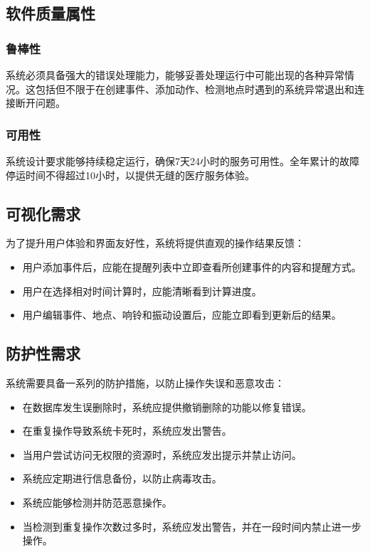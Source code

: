 \subsection{软件质量属性}
\subsubsection{鲁棒性}
系统必须具备强大的错误处理能力，能够妥善处理运行中可能出现的各种异常情况。这包括但不限于在创建事件、添加动作、检测地点时遇到的系统异常退出和连接断开问题。

\subsubsection{可用性}
系统设计要求能够持续稳定运行，确保7天24小时的服务可用性。全年累计的故障停运时间不得超过10小时，以提供无缝的医疗服务体验。

\subsection{可视化需求}
为了提升用户体验和界面友好性，系统将提供直观的操作结果反馈：
\begin{itemize}
	\item 用户添加事件后，应能在提醒列表中立即查看所创建事件的内容和提醒方式。
	\item 用户在选择相对时间计算时，应能清晰看到计算进度。
	\item 用户编辑事件、地点、响铃和振动设置后，应能立即看到更新后的结果。
\end{itemize}

\subsection{防护性需求}
系统需要具备一系列的防护措施，以防止操作失误和恶意攻击：
\begin{itemize}
	\item 在数据库发生误删除时，系统应提供撤销删除的功能以修复错误。
	\item 在重复操作导致系统卡死时，系统应发出警告。
	\item 当用户尝试访问无权限的资源时，系统应发出提示并禁止访问。
	\item 系统应定期进行信息备份，以防止病毒攻击。
	\item 系统应能够检测并防范恶意操作。
	\item 当检测到重复操作次数过多时，系统应发出警告，并在一段时间内禁止进一步操作。
\end{itemize}

